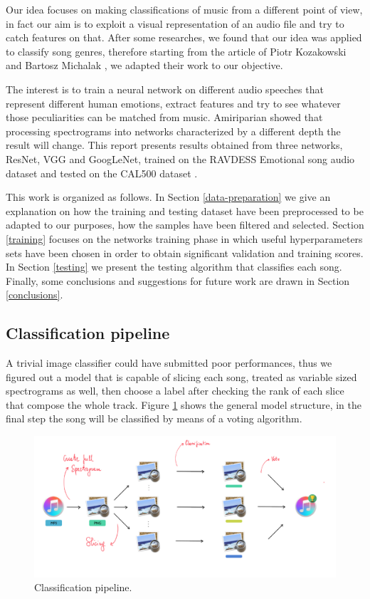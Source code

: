 \documentclass[10pt,twocolumn,letterpaper]{article}
\begin{document}
Our idea focuses on making classifications of music from a different point of view, in fact our aim is to exploit a visual representation of an audio file and try to catch features on that.
After some researches, we found that our idea was applied to classify song genres, therefore starting from the article of Piotr Kozakowski and Bartosz Michalak \cite{Kozakowski}, we adapted their work to our objective.

The interest is to train a neural network on different audio speeches that represent different human emotions, extract features and try to see whatever those peculiarities can be matched from music. Amiriparian \etal \cite{Amiriparian} showed that processing spectrograms into networks characterized by a different depth the result will change. This report presents results obtained from three networks, ResNet, VGG and GoogLeNet, trained on the RAVDESS Emotional song audio dataset \cite{Ravdess} and tested on the CAL500 dataset \cite{CAL500}.

This work is organized as follows. In Section \ref{data-preparation} we give an explanation on how the training and testing dataset have been preprocessed to be adapted to our purposes, how the samples have been filtered and selected. Section \ref{training} focuses on the networks training phase in which useful hyperparameters sets have been chosen in order to obtain significant validation and training scores. In Section \ref{testing} we present the testing algorithm that classifies each song. Finally, some conclusions and suggestions for future work are drawn in Section \ref{conclusions}.

\subsection{Classification pipeline}

A trivial image classifier could have submitted poor performances, thus we figured out a model that is capable of slicing each song, treated as variable sized spectrograms as well, then choose a label after checking the rank of each slice that compose the whole track. Figure \ref{fig:pipeline} shows the general model structure, in the final step the song will be classified by means of a voting algorithm.

\begin{figure}
   \begin{center}
   \includegraphics[width=0.8\linewidth]{img/Pipeline-project}
   \end{center}
      \caption{Classification pipeline.}
   \label{fig:pipeline}
   \end{figure}
\end{document}
